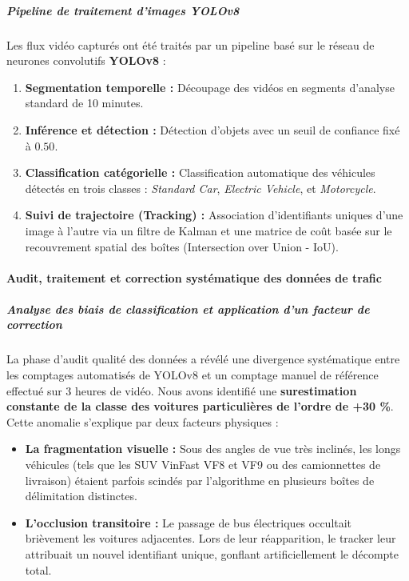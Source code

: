 \documentclass[10pt, a4paper]{article}
\providecommand{\tightlist}{}
\begin{document}
\subparagraph{Pipeline de traitement d'images
YOLOv8}\label{pipeline-de-traitement-dimages-yolov8}

Les flux vidéo capturés ont été traités par un pipeline basé sur le
réseau de neurones convolutifs \textbf{YOLOv8} :

\begin{enumerate}
\def\labelenumi{\arabic{enumi}.}
\tightlist
\item
  \textbf{Segmentation temporelle :} Découpage des vidéos en segments
  d'analyse standard de 10 minutes.
\item
  \textbf{Inférence et détection :} Détection d'objets avec un seuil de
  confiance fixé à \(0.50\).
\item
  \textbf{Classification catégorielle :} Classification automatique des
  véhicules détectés en trois classes : \emph{Standard Car},
  \emph{Electric Vehicle}, et \emph{Motorcycle}.
\item
  \textbf{Suivi de trajectoire (Tracking) :} Association d'identifiants
  uniques d'une image à l'autre via un filtre de Kalman et une matrice
  de coût basée sur le recouvrement spatial des boîtes (Intersection
  over Union - IoU).
\end{enumerate}

\paragraph{Audit, traitement et correction systématique des données de
trafic}\label{audit-traitement-et-correction-systuxe9matique-des-donnuxe9es-de-trafic}

\subparagraph{Analyse des biais de classification et application d'un
facteur de
correction}\label{analyse-des-biais-de-classification-et-application-dun-facteur-de-correction}

La phase d'audit qualité des données a révélé une divergence
systématique entre les comptages automatisés de YOLOv8 et un comptage
manuel de référence effectué sur 3 heures de vidéo. Nous avons identifié
une \textbf{surestimation constante de la classe des voitures
particulières de l'ordre de +30 \%}. Cette anomalie s'explique par deux
facteurs physiques :

\begin{itemize}
\tightlist
\item
  \textbf{La fragmentation visuelle :} Sous des angles de vue très
  inclinés, les longs véhicules (tels que les SUV VinFast VF8 et VF9 ou
  des camionnettes de livraison) étaient parfois scindés par
  l'algorithme en plusieurs boîtes de délimitation distinctes.
\item
  \textbf{L'occlusion transitoire :} Le passage de bus électriques
  occultait brièvement les voitures adjacentes. Lors de leur
  réapparition, le tracker leur attribuait un nouvel identifiant unique,
  gonflant artificiellement le décompte total.
\end{itemize}
\end{document}
